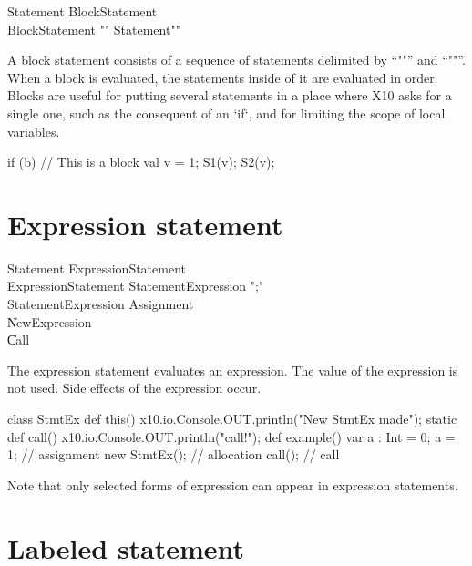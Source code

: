 \begin{grammar}
Statement \: BlockStatement \\
BlockStatement \: \xcd"{" Statement\star \xcd"}" \\
\end{grammar}

A block statement consists of a sequence of statements delimited by
``\xcd"{"'' and ``\xcd"}"''. When a block is evaluated, the statements inside
of it are evaluated in order.  Blocks are useful for putting several
statements in a place where X10 asks for a single one, such as the consequent
of an \xcd`if`, and for limiting the scope of local variables.
\begin{xten}
if (b) {
  // This is a block
  val v = 1;
  S1(v); 
  S2(v);
}
\end{xten}


\section{Expression statement}

\begin{grammar}
Statement \: ExpressionStatement \\
ExpressionStatement \: StatementExpression \xcd";" \\
StatementExpression \: Assignment \\
          \| NewExpression \\
          \| Call \\
\end{grammar}

The expression statement evaluates an expression.  The value of the expression
is not used.
Side effects of the expression occur.  
\begin{xten}
class StmtEx {
  def this() { x10.io.Console.OUT.println("New StmtEx made");  }
  static def call() { x10.io.Console.OUT.println("call!");  }
  def example() {
     var a : Int = 0;
     a = 1; // assignment
     new StmtEx(); // allocation
     call(); // call
  }
}
\end{xten}
%
Note that only selected forms of expression can appear in expression
statements.  


\section{Labeled statement}

